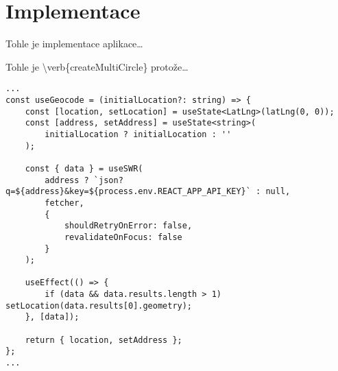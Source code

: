 \hypertarget{implementace}{%
\chapter{Implementace}\label{implementace}}

Tohle je implementace aplikace\ldots{}

Tohle je \textbackslash verb\{createMultiCircle\} protože\ldots{}

\begin{verbatim}
...
const useGeocode = (initialLocation?: string) => {
    const [location, setLocation] = useState<LatLng>(latLng(0, 0));
    const [address, setAddress] = useState<string>(
        initialLocation ? initialLocation : ''
    );

    const { data } = useSWR(
        address ? `json?q=${address}&key=${process.env.REACT_APP_API_KEY}` : null,
        fetcher,
        {
            shouldRetryOnError: false,
            revalidateOnFocus: false
        }
    );

    useEffect(() => {
        if (data && data.results.length > 1) setLocation(data.results[0].geometry);
    }, [data]);

    return { location, setAddress };
};
...
\end{verbatim}
